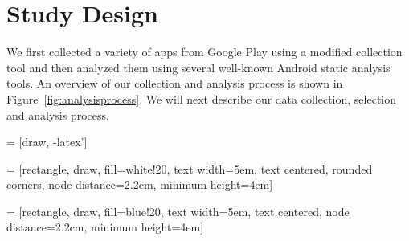 \documentclass{sig-alternate-05-2015}
\begin{document}











\section{Study Design}
\label{sec:studydesign}

We first collected a variety of apps from Google Play using a modified collection tool and then analyzed them using several well-known Android static analysis tools. An overview of our collection and analysis process is shown in Figure~\ref{fig:analysisprocess}. We will next describe our data collection, selection and analysis process.

 = [draw, -latex']

   = [rectangle, draw, fill=white!20,
    text width=5em, text centered, rounded corners, node distance=2.2cm, minimum height=4em]


 = [rectangle, draw, fill=blue!20,
    text width=5em, text centered, node distance=2.2cm, minimum height=4em]

\end{document}
